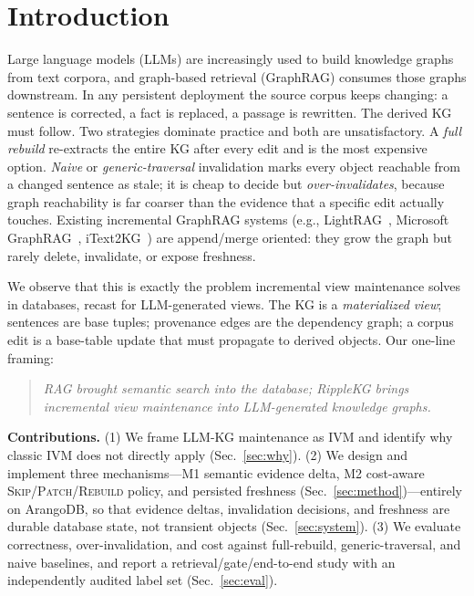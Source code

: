 \documentclass[conference]{IEEEtran}
\begin{document}
\section{Introduction}
Large language models (LLMs) are increasingly used to build knowledge graphs
from text corpora, and graph-based retrieval (GraphRAG) consumes those graphs
downstream. In any persistent deployment the source corpus keeps changing: a
sentence is corrected, a fact is replaced, a passage is rewritten. The derived
KG must follow. Two strategies dominate practice and both are unsatisfactory.
A \emph{full rebuild} re-extracts the entire KG after every edit and is the most
expensive option. \emph{Naive} or \emph{generic-traversal} invalidation marks
every object reachable from a changed sentence as stale; it is cheap to decide
but \emph{over-invalidates}, because graph reachability is far coarser than the
evidence that a specific edit actually touches. Existing incremental
GraphRAG systems (e.g., LightRAG~\cite{lightrag}, Microsoft
GraphRAG~\cite{graphrag}, iText2KG~\cite{itext2kg}) are append/merge oriented:
they grow the graph but rarely delete, invalidate, or expose freshness.

We observe that this is exactly the problem incremental view maintenance solves
in databases, recast for LLM-generated views. The KG is a \emph{materialized
view}; sentences are base tuples; provenance edges are the dependency graph; a
corpus edit is a base-table update that must propagate to derived objects. Our
one-line framing:

\begin{quote}\itshape
RAG brought semantic search into the database; RippleKG brings incremental view
maintenance into LLM-generated knowledge graphs.
\end{quote}

\noindent\textbf{Contributions.}
(1) We frame LLM-KG maintenance as IVM and identify why classic IVM does not
directly apply (Sec.~\ref{sec:why}). (2) We design and implement three
mechanisms---M1 semantic evidence delta, M2 cost-aware
\textsc{Skip}/\textsc{Patch}/\textsc{Rebuild} policy, and persisted freshness
(Sec.~\ref{sec:method})---entirely on ArangoDB, so that evidence deltas,
invalidation decisions, and freshness are durable database state, not transient
objects (Sec.~\ref{sec:system}). (3) We evaluate correctness, over-invalidation,
and cost against full-rebuild, generic-traversal, and naive baselines, and report
a retrieval/gate/end-to-end study with an independently audited label set
(Sec.~\ref{sec:eval}).
\end{document}
